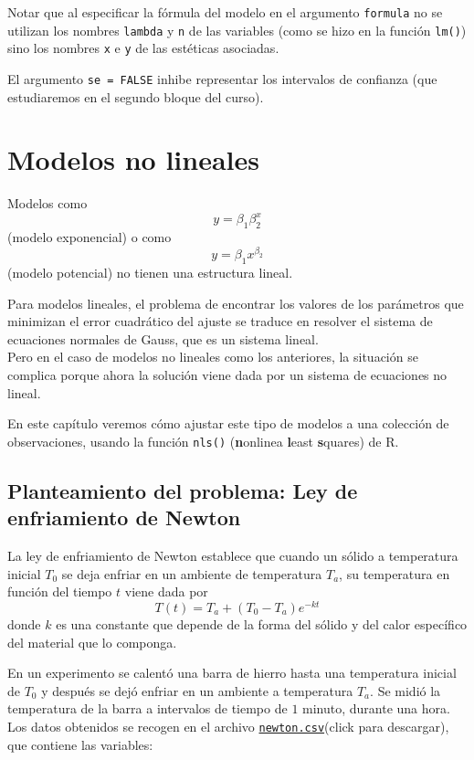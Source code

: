 \documentclass[
  degree=mecinf,
  title=normal,
  toc=normal,
  bib=normal]{mnye}
\begin{document}
Notar que al especificar la fórmula del modelo en el argumento \texttt{formula} no se utilizan los nombres \texttt{lambda} y \texttt{n} de las variables (como se hizo en la función \texttt{lm()}) sino los nombres \texttt{x} e \texttt{y} de las estéticas asociadas.

El argumento \texttt{se\ =\ FALSE} inhibe representar los intervalos de confianza (que estudiaremos en el segundo bloque del curso).

\hypertarget{nls}{%
\section{Modelos no lineales}\label{nls}}

Modelos como
\[y = \beta_1 \beta_2^{x}\]
(modelo exponencial) o como
\[y = \beta_1x^{\beta_2}\]
(modelo potencial) no tienen una estructura lineal.

Para modelos lineales, el problema de encontrar los valores de los parámetros que minimizan el error cuadrático del ajuste se traduce en resolver el sistema de ecuaciones normales de Gauss, que es un sistema lineal.\\
Pero en el caso de modelos no lineales como los anteriores, la situación se complica porque ahora la solución viene dada por un sistema de ecuaciones no lineal.

En este capítulo veremos cómo ajustar este tipo de modelos a una colección de observaciones, usando la función \texttt{nls()} (\textbf{n}onlinea \textbf{l}east \textbf{s}quares) de \textsf{R}.

\hypertarget{planteamiento-del-problema-ley-de-enfriamiento-de-newton}{%
\subsection{Planteamiento del problema: Ley de enfriamiento de Newton}\label{planteamiento-del-problema-ley-de-enfriamiento-de-newton}}

La ley de enfriamiento de Newton establece que cuando un sólido a temperatura inicial \(T_0\) se deja enfriar en un ambiente de temperatura \(T_a\), su temperatura en función del tiempo \(t\) viene dada por
\[T(t)=T_a+(T_0-T_a)e^{-kt}\]
donde \(k\) es una constante que depende de la forma del sólido y del calor específico del material que lo componga.

En un experimento se calentó una barra de hierro hasta una temperatura inicial de \(T_0\) y después se dejó enfriar en un ambiente a temperatura \(T_a\). Se midió la temperatura de la barra a intervalos de tiempo de \(1\) minuto, durante una hora. Los datos obtenidos se recogen en el archivo \href{https://drive.google.com/uc?export=download\&id=1mpF0_lZVw-u2SlrxJDwczEI4x_OxO1W2}{\texttt{newton.csv}}(click para descargar), que contiene las variables:
\end{document}
